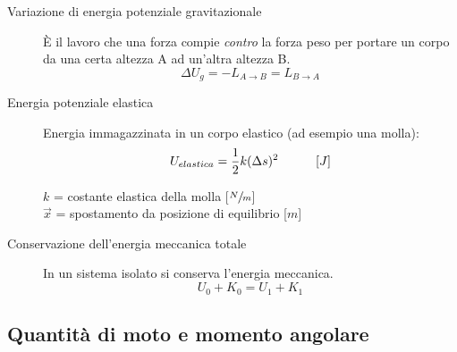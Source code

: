 \documentclass[a4paper,11pt,italian]{article}
\begin{document}
\begin{description}
  \item[Variazione di energia potenziale gravitazionale] 
  È il lavoro che una forza compie \textit{contro} la forza peso per portare un corpo da una certa altezza A ad un'altra altezza B. 
  \[ \Delta U_g = -L_{A\rightarrow B} = L_{B\rightarrow A} \]
  
  \item[Energia potenziale elastica] 
  Energia immagazzinata in un corpo elastico (ad esempio una molla):
  \[ U_{elastica} = \frac{1}{2} k (\Delta s)^2 \hspace*{3em} [J] \]
  \begin{multicols}{2}
  $ k $ = costante elastica della molla [$ \sfrac{N}{m} $]\\
  $ \vec{x} $ = spostamento da posizione di equilibrio [$ m $]
  \end{multicols}
  
  \item[Conservazione dell'energia meccanica totale] 
  In un sistema isolato si conserva l'energia meccanica. 
  \[ U_0 + K_0 = U_1 + K_1 \]
\end{description}



\subsection{Quantità di moto e momento angolare}
\end{document}
